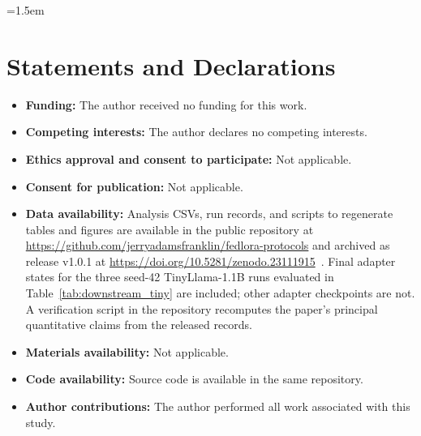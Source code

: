 \documentclass[iicol,pdflatex,sn-mathphys-num]{sn-jnl}
\providecommand{\doiurl}[1]{\url{https://doi.org/#1}}
\begin{document}
{\emergencystretch=1.5em

}

\section*{Statements and Declarations}

\begin{itemize}
\item \textbf{Funding:} The author received no funding for this work.
\item \textbf{Competing interests:} The author declares no competing interests.
\item \textbf{Ethics approval and consent to participate:} Not applicable.
\item \textbf{Consent for publication:} Not applicable.
\item \textbf{Data availability:} Analysis CSVs, run records, and scripts to regenerate tables and figures are available in the public repository at \url{https://github.com/jerryadamsfranklin/fedlora-protocols} and archived as release v1.0.1 at \doiurl{10.5281/zenodo.23111915}~\cite{franklin2026fedloraprotocols}. Final adapter states for the three seed-42 TinyLlama-1.1B runs evaluated in Table~\ref{tab:downstream_tiny} are included; other adapter checkpoints are not. A verification script in the repository recomputes the paper's principal quantitative claims from the released records.
\item \textbf{Materials availability:} Not applicable.
\item \textbf{Code availability:} Source code is available in the same repository.
\item \textbf{Author contributions:} The author performed all work associated with this study.
\end{itemize}
\end{document}
